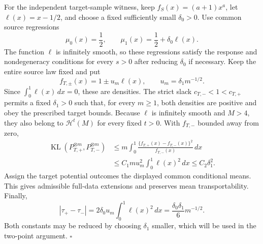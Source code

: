 For the independent target-sample witness, keep \(f_S(x)=(a+1)x^a\), let \(\ell(x)=x-1/2\), and choose a fixed sufficiently small \(\delta_0>0\). Use common source regressions
\[
\mu_0(x)=\frac12,
\qquad
\mu_1(x)=\frac12+\delta_0\ell(x).
\]
The function \(\ell\) is infinitely smooth, so these regressions satisfy the response and nondegeneracy conditions for every \(s>0\) after reducing \(\delta_0\) if necessary. Keep the entire source law fixed and put
\[
f_{T,\pm}(x)=1\pm u_m\ell(x),
\qquad
u_m=\delta_1m^{-1/2}.
\]
Since \(\int_0^1\ell(x)\,dx=0\), these are densities. The strict slack \(c_{T,-}<1<c_{T,+}\) permits a fixed \(\delta_1>0\) such that, for every \(m\ge1\), both densities are positive and obey the prescribed target bounds. Because \(\ell\) is infinitely smooth and \(M>4\), they also belong to \(\mathcal H^t(M)\) for every fixed \(t>0\). With \(f_{T,-}\) bounded away from zero,
\[
\begin{aligned}
\operatorname{KL}(P_{T,+}^{\otimes m},P_{T,-}^{\otimes m})
&\le m\int_0^1
\frac{\{f_{T,+}(x)-f_{T,-}(x)\}^2}{f_{T,-}(x)}\,dx\\
&\le C_1m u_m^2\int_0^1\ell(x)^2\,dx
\le C_2\delta_1^2.
\end{aligned}
\]
Assign the target potential outcomes the displayed common conditional means. This gives admissible full-data extensions and preserves mean transportability. Finally,
\[
\left|\tau_+-\tau_-\right|
=2\delta_0u_m\int_0^1\ell(x)^2\,dx
=\frac{\delta_0\delta_1}{6}m^{-1/2}.
\]
Both constants may be reduced by choosing \(\delta_1\) smaller, which will be used in the two-point argument. \(\square\)